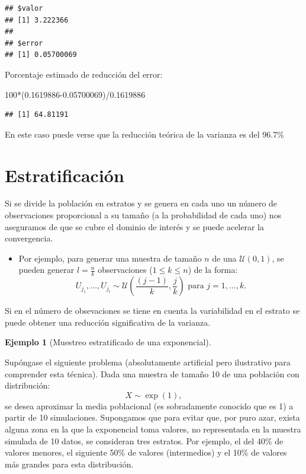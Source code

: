 \documentclass[
]{book}
\newenvironment{Shaded}{\begin{snugshade}}{\end{snugshade}}
\newcommand{\DecValTok}[1]{\textcolor[rgb]{0.00,0.00,0.81}{#1}}
\newcommand{\FloatTok}[1]{\textcolor[rgb]{0.00,0.00,0.81}{#1}}
\newcommand{\NormalTok}[1]{#1}
\newcommand{\SpecialCharTok}[1]{\textcolor[rgb]{0.00,0.00,0.00}{#1}}
\providecommand{\tightlist}{%
  \setlength{\itemsep}{0pt}\setlength{\parskip}{0pt}}
\theoremstyle{break}
\theoremstyle{definition}
\theoremstyle{definition}
\newtheorem{example}{Ejemplo}[chapter]
\theoremstyle{definition}
\theoremstyle{definition}
\theoremstyle{remark}
\begin{document}
\begin{verbatim}
## $valor
## [1] 3.222366
## 
## $error
## [1] 0.05700069
\end{verbatim}

Porcentaje estimado de reducción del error:

\begin{Shaded}
\begin{Highlighting}[]
\DecValTok{100}\SpecialCharTok{*}\NormalTok{(}\FloatTok{0.1619886{-}0.05700069}\NormalTok{)}\SpecialCharTok{/}\FloatTok{0.1619886}
\end{Highlighting}
\end{Shaded}

\begin{verbatim}
## [1] 64.81191
\end{verbatim}

En este caso puede verse que la reducción teórica de la varianza es del 96.7\%

\hypertarget{estratificaciuxf3n}{%
\section{Estratificación}\label{estratificaciuxf3n}}

Si se divide la población en estratos y se genera en cada uno un
número de observaciones proporcional a su tamaño (a la probabilidad de cada uno) nos
aseguramos de que se cubre el dominio de interés y se puede acelerar
la convergencia.

\begin{itemize}
\tightlist
\item
  Por ejemplo, para generar una muestra de tamaño \(n\) de una
  \(\mathcal{U}\left( 0,1\right)\), se pueden generar \(l=\frac{n}{k}\)
  observaciones (\(1\leq k\leq n\)) de la forma:
  \[U_{j_{1}},\ldots,U_{j_{l}}\sim \mathcal{U}\left(  \frac{(j-1)}{k},\frac{j}{k}\right)  \text{ para }j=1,...,k.\]
\end{itemize}

Si en el número de obsevaciones se tiene en cuenta la
variabilidad en el estrato se puede obtener una reducción
significativa de la varianza.

\begin{example}[Muestreo estratificado de una exponencial]
\protect\hypertarget{exm:estr-exp}{}{\label{exm:estr-exp} {} }
\end{example}

Supóngase el siguiente problema (absolutamente artificial pero ilustrativo para comprender esta técnica).
Dada una muestra de tamaño 10 de una población con distribución:
\[X \sim \exp\left( 1 \right),\]
se desea aproximar la media poblacional (es sobradamente conocido que es 1) a partir de 10 simulaciones.
Supongamos que para evitar que, por puro azar, exista alguna zona en la que la exponencial toma valores, no representada en la muestra simulada de 10 datos, se consideran tres estratos.
Por ejemplo, el del 40\% de valores menores, el siguiente 50\% de valores (intermedios) y el 10\% de valores más grandes para esta distribución.
\end{document}
